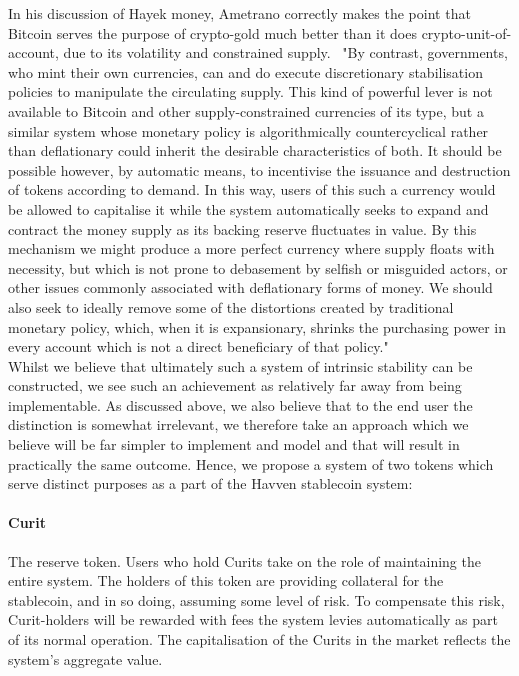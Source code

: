 \documentclass{article}
\begin{document}
\noindent  In his discussion of Hayek money, Ametrano correctly makes the point that Bitcoin serves the purpose of crypto-gold much better than it does crypto-unit-of-account, due to its volatility and constrained supply.~\cite{ametrano2016hayek} "By contrast, governments, who mint their own currencies, can and do execute discretionary stabilisation policies to manipulate the circulating supply. This kind of powerful lever is not available to Bitcoin and other supply-constrained currencies of its type, but a similar system whose monetary policy is algorithmically countercyclical rather than deflationary could inherit the desirable characteristics of both. It should be possible however, by automatic means, to incentivise the issuance and destruction of tokens according to demand. In this way, users of this such a currency would be allowed to capitalise it while the system automatically seeks to expand and contract the money supply as its backing reserve fluctuates in value. By this mechanism we might produce a more perfect currency where supply floats with necessity, but which is not prone to debasement by selfish or misguided actors, or other issues commonly associated with deflationary forms of money. We should also seek to ideally remove some of the distortions created by traditional monetary policy, which, when it is expansionary, shrinks the purchasing power in every account which is not a direct beneficiary of that policy." \\

\noindent Whilst we believe that ultimately such a system of intrinsic stability can be constructed, we see such an achievement as relatively far away from being implementable. As discussed above, we also believe that to the end user the distinction is somewhat irrelevant, we therefore take an approach which we believe will be far simpler to implement and model and that will result in practically the same outcome. Hence, we propose a system of two tokens which serve distinct purposes as a part of the Havven stablecoin system:

\paragraph{Curit} The reserve token. Users who hold Curits take on the role of maintaining the entire system. The holders of this token are providing collateral for the stablecoin, and in so doing, assuming some level of risk. To compensate this risk, Curit-holders will be rewarded with fees the system levies automatically as part of its normal operation. The capitalisation of the Curits in the market reflects the system's aggregate value.
\end{document}
